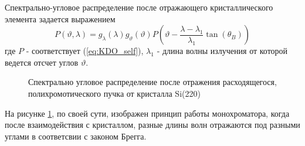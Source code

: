  Спектрально-угловое распределение после отражающего кристаллического элемента задается выражением
  \begin{equation} \label{eq:monochromator_spectra}
    P(\vartheta,\lambda) = g_{\lambda}(\lambda)g_{\vartheta}(\vartheta) P(\vartheta - \frac{\lambda - \lambda_1}{\lambda_1}\tan(\theta_B))
   \end{equation}
где $P$ - соответствует (\ref{eq:KDO_self}), $\lambda_1$ - длина волны излучения от которой ведется отсчет углов $\vartheta$.
\begin{figure}[H]
  \centering
  \hfill

  \caption{Спектрально угловое распределение после отражения расходящегося, полихромотического пучка от кристалла Si(220)}
  \label{ris:single_crystal_schem_lamtet}
\end{figure}

На рисунке \ref{ris:single_crystal_schem_lamtet}, по своей сути, изображен принцип работы монохроматора,
когда после взаимодействия с кристаллом, разные длины волн отражаются под разными углами в
соответсвии с законом Брегга.

